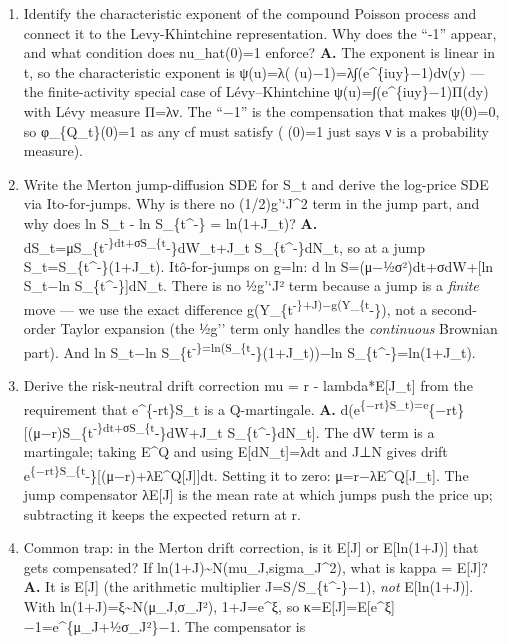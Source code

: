 \documentclass[
  11pt,
]{article}
\begin{document}
\begin{enumerate}
  exponential series:
  =e\textsuperscript{\{−λt\}e}\{λt(u)\}=exp(tλ((u)−1)).
\item
  Identify the characteristic exponent of the compound Poisson process
  and connect it to the Levy-Khintchine representation. Why does the
  ``-1'' appear, and what condition does nu\_hat(0)=1 enforce?
  \textbf{A.} The exponent is linear in t, so the characteristic
  exponent is ψ(u)=λ((u)−1)=λ∫(e\^{}\{iuy\}−1)dν(y) --- the
  finite-activity special case of Lévy--Khintchine
  ψ(u)=∫(e\^{}\{iuy\}−1)Π(dy) with Lévy measure Π=λν. The ``−1'' is the
  compensation that makes ψ(0)=0, so φ\_\{Q\_t\}(0)=1 as any cf must
  satisfy ((0)=1 just says ν is a probability measure).
\item
  Write the Merton jump-diffusion SDE for S\_t and derive the log-price
  SDE via Ito-for-jumps. Why is there no (1/2)g'`J\^{}2 term in the jump
  part, and why does ln S\_t - ln S\_\{t\^{}-\} = ln(1+J\_t)?
  \textbf{A.} dS\_t=μS\_\{t\textsuperscript{-\}dt+σS\_\{t}-\}dW\_t+J\_t
  S\_\{t\^{}-\}dN\_t, so at a jump S\_t=S\_\{t\^{}-\}(1+J\_t).
  Itô-for-jumps on g=ln: d ln S=(μ−½σ²)dt+σdW+{[}ln S\_t−ln
  S\_\{t\^{}-\}{]}dN\_t. There is no ½g'`J² term because a jump is a
  \emph{finite} move --- we use the exact difference
  g(Y\_\{t\textsuperscript{-\}+J)−g(Y\_\{t}-\}), not a second-order
  Taylor expansion (the ½g'' term only handles the \emph{continuous}
  Brownian part). And ln S\_t−ln
  S\_\{t\textsuperscript{-\}=ln(S\_\{t}-\}(1+J\_t))−ln
  S\_\{t\^{}-\}=ln(1+J\_t).
\item
  Derive the risk-neutral drift correction mu = r - lambda*E{[}J\_t{]}
  from the requirement that e\^{}\{-rt\}S\_t is a Q-martingale.
  \textbf{A.}
  d(e\textsuperscript{\{−rt\}S\_t)=e}\{−rt\}{[}(μ−r)S\_\{t\textsuperscript{-\}dt+σS\_\{t}-\}dW+J\_t
  S\_\{t\^{}-\}dN\_t{]}. The dW term is a martingale; taking E\^{}Q and
  using E{[}dN\_t{]}=λdt and J⊥N gives drift
  e\textsuperscript{\{−rt\}S\_\{t}-\}{[}(μ−r)+λE\^{}Q{[}J{]}{]}dt.
  Setting it to zero: μ=r−λE\^{}Q{[}J\_t{]}. The jump compensator
  λE{[}J{]} is the mean rate at which jumps push the price up;
  subtracting it keeps the expected return at r.
\item
  Common trap: in the Merton drift correction, is it E{[}J{]} or
  E{[}ln(1+J){]} that gets compensated? If
  ln(1+J)\textasciitilde N(mu\_J,sigma\_J\^{}2), what is kappa =
  E{[}J{]}? \textbf{A.} It is E{[}J{]} (the arithmetic multiplier
  J=S/S\_\{t\^{}-\}−1), \emph{not} E{[}ln(1+J){]}. With
  ln(1+J)=ξ\textasciitilde N(μ\_J,σ\_J²), 1+J=e\^{}ξ, so
  κ=E{[}J{]}=E{[}e\^{}ξ{]}−1=e\^{}\{μ\_J+½σ\_J²\}−1. The compensator is

\end{enumerate}
\end{document}
